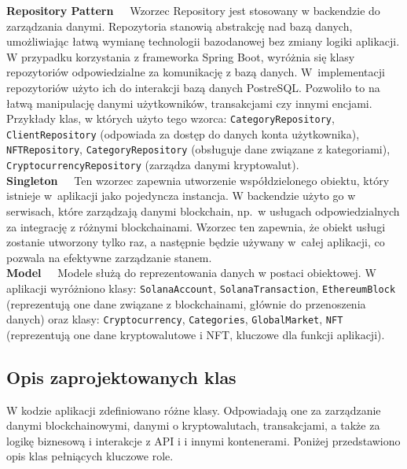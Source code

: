 \noindent \textbf{Repository Pattern~~}
Wzorzec Repository jest stosowany w backendzie do zarządzania danymi. Repozytoria stanowią abstrakcję nad bazą danych, umożliwiając łatwą wymianę technologii bazodanowej bez zmiany logiki aplikacji. W przypadku korzystania z frameworka Spring Boot, wyróżnia się klasy repozytoriów odpowiedzialne za komunikację z bazą danych. W~implementacji repozytoriów użyto ich do interakcji bazą danych PostreSQL. Pozwoliło to  na łatwą manipulację danymi użytkowników, transakcjami czy innymi encjami. Przykłady klas, w których użyto tego wzorca: \texttt{CategoryRepository}, \texttt{ClientRepository} (odpowiada za dostęp do danych konta użytkownika), \texttt{NFTRepository},   \texttt{CategoryRepository} (obsługuje dane związane z kategoriami), \texttt{CryptocurrencyRepository} (zarządza danymi kryptowalut).\\[-10pt]

\noindent \textbf{Singleton~~}
Ten wzorzec zapewnia utworzenie współdzielonego obiektu, który istnieje w~aplikacji jako pojedyncza instancja. W backendzie użyto go w serwisach, które zarządzają danymi blockchain, np.\ w usługach odpowiedzialnych za integrację z różnymi blockchainami. Wzorzec ten zapewnia, że obiekt usługi zostanie utworzony tylko raz, a następnie będzie używany w~całej aplikacji, co pozwala na efektywne zarządzanie stanem.\\[-10pt]

\noindent \textbf{Model~~}
Modele służą do reprezentowania danych w postaci obiektowej. W aplikacji wyróżniono klasy: \texttt{SolanaAccount}, \texttt{SolanaTransaction}, \texttt{EthereumBlock} (reprezentują one dane związane z blockchainami, głównie do przenoszenia danych) oraz klasy: \texttt{Cryptocurrency}, \texttt{Categories}, \texttt{GlobalMarket}, \texttt{NFT} (reprezentują one dane kryptowalutowe i NFT, kluczowe dla funkcji aplikacji).


\subsection{Opis zaprojektowanych klas}
W kodzie aplikacji zdefiniowano różne klasy. Odpowiadają one za zarządzanie danymi blockchainowymi, danymi o kryptowalutach, transakcjami, a także za logikę biznesową i interakcje z API i i innymi kontenerami. Poniżej przedstawiono opis klas pełniących kluczowe role.\\[-10pt]

